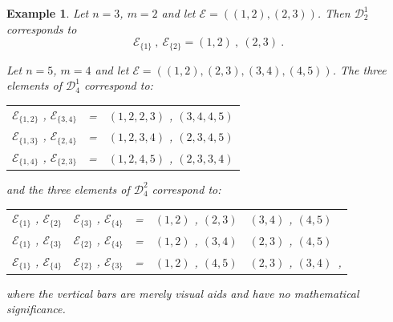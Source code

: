 \documentclass[10pt]{amsart}
\newcommand{\sE}{\mathcal{E}}
\theoremstyle{plain}
\newtheorem{ex}[thm]{Example}
\newcommand{\0}{\color{blue}{\mathsf{0}}}
\begin{document}
\begin{ex} \label{ExamplesofEIforWheels}
    Let $n=3$, $m=2$  and let $\sE =( (1,2), (2,3)) $. Then $\mathcal{D}^1_{2}$ corresponds to
$$
\sE_{\{1\}}\ ,\ \sE_{\{2\}}     =   (1,2) \ ,\ (2,3)\ .$$

\vspace{0.05in}
    Let $n=5$, $m=4$  and let $\sE =( (1,2), (2,3), (3,4), (4,5)) $.  The three elements of $\mathcal{D}^1_{4}$ correspond to: 

\vspace{0.05in}
\begin{center}
   \begin{tabular}{ccc}
       $\sE_{\{1,2\}}$ , $\sE_{\{3,4\}}$   &  = &  $(1,2,2,3)$ , $(3,4,4,5)$  \\
         $\sE_{\{1,3\}}$ , $\sE_{\{2,4\}}$   &  = &  $(1,2,3,4)$ , $(2,3,4,5)$  \\
          $\sE_{\{1,4\}}$ , $\sE_{\{2,3\}}$   &  = &  $(1,2,4,5)$ , $(2,3,3,4)$ \\
    \end{tabular}
\end{center}
  \vspace{0.05in}
  
\noindent and the three elements of $\mathcal{D}^2_{4}$ correspond to: 

\vspace{0.05in}
\begin{center}
 \begin{tabular}{c|ccc|l}
       $\sE_{\{1\}}$ , $\sE_{\{2\}}$   &   $\sE_{\{3\}}$ , $\sE_{\{4\}}$  &  = &  $(1,2)$  , $(2,3)$ &  $(3,4)$ ,   $(4, 5)$  \\
         $\sE_{\{1\}}$ , $\sE_{\{3\}}$   &   $\sE_{\{2\}}$ , $\sE_{\{4\}}$  &   = &  $(1,2)$  , $(3,4)$ & $(2,3)$ , $(4,5)$   \\
          $\sE_{\{1\}}$ , $\sE_{\{4\}}$  &   $\sE_{\{2\}}$ , $\sE_{\{3\}}$   &  = &  $(1,2)$  , $(4,5)$  &  $(2,3)$ , $(3,4)$\ ,  \\
    \end{tabular}
\end{center}
\vspace{0.05in}
    
 \noindent   where the vertical bars are merely visual aids and have no mathematical significance. 
\end{ex}
\end{document}
